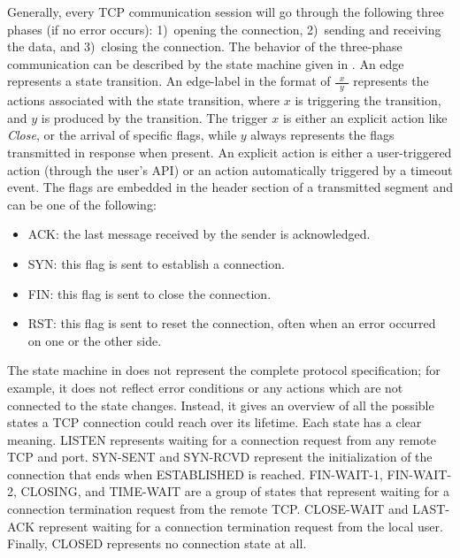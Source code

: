 \documentclass[conference]{IEEEtran}
\def\state#1{\textsf{\MakeUppercase{#1}}\xspace}
\def\sclosed{\state{closed}}
\def\ssynsent{\state{syn-sent}}
\def\ssynrcv{\state{syn-rcvd}}
\def\slisten{\state{listen}}
\def\sestab{\state{established}}
\def\sfwone{\state{fin-wait-1}}
\def\sfwtwo{\state{fin-wait-2}}
\def\sclosing{\state{closing}}
\def\sclosew{\state{close-wait}}
\def\slastack{\state{last-ack}}
\def\stimewait{\state{time-wait}}
\def\flag#1{\textsf{#1}\xspace}
\def\syn{\flag{SYN}}
\def\ack{\flag{ACK}}
\def\rst{\flag{RST}}
\def\fin{\flag{FIN}}
\begin{document}
Generally, every TCP communication session will go through the following three phases (if no error occurs): 1)~opening the connection, 2)~sending and receiving the data, and 3)~closing the connection. The behavior of the three-phase communication can be described by the state machine given in . An edge represents a state transition.
An edge-label in the format of $\frac{\ \ x \ \ }{\ \ y \ \ }$ represents the actions associated with the state transition, where $x$ is triggering the transition, and $y$ is produced by the transition.
The trigger $x$ is either an explicit action like \textit{Close}, or the arrival of specific flags, while $y$ always represents the flags transmitted in response when present.
An explicit action is either a user-triggered action (through the user's API) or an action automatically triggered by a timeout event. The flags are embedded in the header section of a transmitted segment and can be one of the following:
\begin{itemize}
\item \ack: the last message received by the sender is acknowledged.
\item \syn: this flag is sent to establish a connection.
\item \fin: this flag is sent to close the connection.
\item \rst: this flag is sent to reset the connection, often when an error
occurred on one or the other side.
\end{itemize}

The state machine in  does not represent the complete protocol specification; for example, it does not reflect error conditions or any actions which are not connected to the state changes. Instead, it gives an overview of all the possible states a TCP connection could reach over its lifetime. Each state has a clear meaning. \slisten represents waiting for a connection request from any remote TCP and port. \ssynsent and \ssynrcv represent the initialization of the connection that ends when \sestab is reached. \sfwone, \sfwtwo, \sclosing, and \stimewait are a group of states that represent waiting for a connection termination request from the remote TCP. \sclosew and \slastack represent waiting for a connection termination request from the local user. Finally, \sclosed represents no connection state at all.

\end{document}
